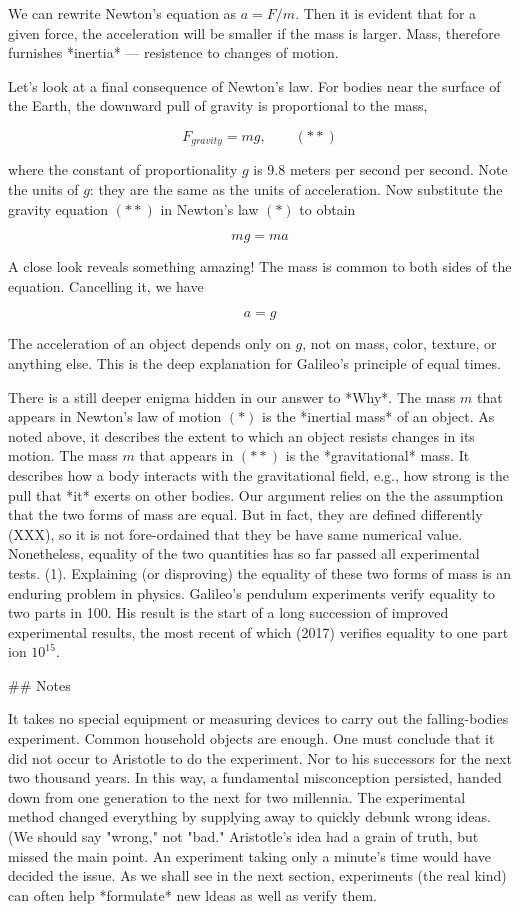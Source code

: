 We can rewrite Newton's equation as $a = F/m$.  Then it is evident that for a given force, the acceleration will be smaller if the mass is larger.  Mass, therefore furnishes *inertia* — resistence to changes of motion. 


Let's look at a final consequence of Newton's law.  For bodies near the surface of the Earth, the downward pull of gravity is proportional to the mass,

$$
F_{gravity} = mg, \qquad (**)
$$

where the constant of proportionality $g$ is 9.8 meters per second per second.  Note the units of $g$: they are the same as the units of acceleration.  Now substitute the gravity equation  $(**)$ in Newton's law $(*)$ to obtain

$$
mg = ma
$$

A close look reveals something amazing!  The mass is common to both sides of the equation.  Cancelling it, we have

$$
a = g
$$

The acceleration of an object depends only on $g$, not on mass, color, texture, or anything else. This is the deep explanation for Galileo's principle of equal times. 


There is a still deeper enigma hidden in our answer to *Why*.  The mass $m$ that appears in Newton's law of motion $(*)$ is the *inertial mass* of an object.  As noted above, it describes the extent to which an object resists changes in its motion.  The mass $m$ that appears in $(**)$ is the *gravitational* mass.  It describes how a body interacts with the gravitational field, e.g., how strong is the pull that *it* exerts on other bodies.  Our argument relies on the the assumption that the two forms of mass are equal.  But in fact, they are defined differently (XXX), so it is not fore-ordained that they be have same numerical value. Nonetheless, equality of the two quantities has so far passed all experimental tests. (1). Explaining (or disproving) the equality of these two forms of mass is an enduring problem in physics.  Galileo's pendulum experiments verify equality to two parts in 100.  His result is the start of a long succession of improved experimental results, the most recent of which (2017) verifies equality to one part ion $10^{15}$.


## Notes

It takes no special equipment or measuring devices to carry out the falling-bodies experiment.  Common household objects are enough.  One must conclude that it did not occur to Aristotle to do the experiment. Nor to his successors for the next two thousand years. In this way, a fundamental misconception persisted, handed down from one generation to the next for two millennia.  The experimental method changed everything by supplying away to quickly debunk wrong ideas. (We should say "wrong," not "bad."  Aristotle's idea had a grain of truth, but missed the main point.  An experiment taking only a minute's time would have decided the issue.  As we shall see in the next section, experiments (the real kind) can often help *formulate* new ldeas as well as verify them.


